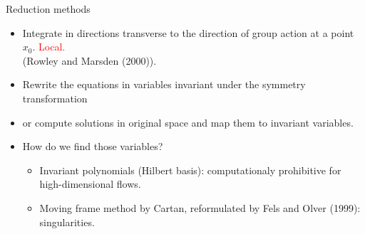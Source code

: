 \documentclass{beamer}
\begin{document}



\begin{frame}{Reduction methods}

\begin{itemize}
	\item Integrate in directions transverse to the direction of group action at a point $x_0$. \textcolor{red}{Local.}\\
	(Rowley and Marsden (2000)).
 \item<alert@1> Rewrite the equations in variables invariant under the symmetry transformation
 \item or compute solutions in original space and map them to invariant variables.
 \item How do we find those variables?
	\begin{itemize}
	\item<alert@1> Invariant polynomials (Hilbert basis): computationaly prohibitive for high-dimensional flows.
	\item<alert@1> Moving frame method by Cartan, reformulated by Fels and Olver (1999): singularities.
	\end{itemize}
\end{itemize}

\end{frame}

% 
%   	
\end{document}
